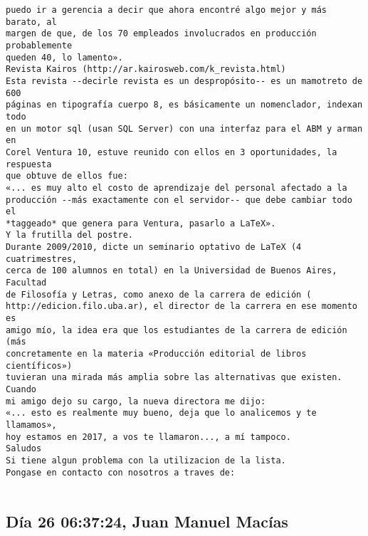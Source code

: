 \documentclass[a4paper,10pt]{article}
\begin{document}
\begin{lstlisting}
puedo ir a gerencia a decir que ahora encontré algo mejor y más barato, al
margen de que, de los 70 empleados involucrados en producción probablemente
queden 40, lo lamento».
Revista Kairos (http://ar.kairosweb.com/k_revista.html)
Esta revista --decirle revista es un despropósito-- es un mamotreto de 600
páginas en tipografía cuerpo 8, es básicamente un nomenclador, indexan todo
en un motor sql (usan SQL Server) con una interfaz para el ABM y arman en
Corel Ventura 10, estuve reunido con ellos en 3 oportunidades, la respuesta
que obtuve de ellos fue:
«... es muy alto el costo de aprendizaje del personal afectado a la
producción --más exactamente con el servidor-- que debe cambiar todo el
*taggeado* que genera para Ventura, pasarlo a LaTeX».
Y la frutilla del postre.
Durante 2009/2010, dicte un seminario optativo de LaTeX (4 cuatrimestres,
cerca de 100 alumnos en total) en la Universidad de Buenos Aires, Facultad
de Filosofía y Letras, como anexo de la carrera de edición (
http://edicion.filo.uba.ar), el director de la carrera en ese momento es
amigo mío, la idea era que los estudiantes de la carrera de edición (más
concretamente en la materia «Producción editorial de libros científicos»)
tuvieran una mirada más amplia sobre las alternativas que existen. Cuando
mi amigo dejo su cargo, la nueva directora me dijo:
«... esto es realmente muy bueno, deja que lo analicemos y te llamamos»,
hoy estamos en 2017, a vos te llamaron..., a mí tampoco.
Saludos
Si tiene algun problema con la utilizacion de la lista.
Pongase en contacto con nosotros a traves de:


\end{lstlisting}

\subsection{Día 26 06:37:24, Juan Manuel Macías}
\end{document}
